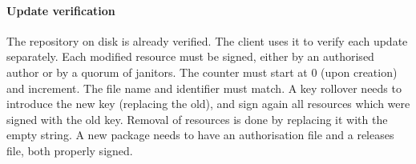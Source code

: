 \documentclass[nocopyrightspace]{sigplanconf}
\begin{document}
\paragraph{Update verification}  The repository on disk is already verified.
The client uses it to verify each update separately.
Each modified resource must be signed, either by an authorised author or by a quorum of janitors.
The counter must start at 0 (upon creation) and increment.
The file name and identifier must match.
A key rollover needs to introduce the new key (replacing the old), and sign again all resources which were signed with the old key.
Removal of resources is done by replacing it with the empty string.
A new package needs to have an authorisation file and a releases file, both properly signed.
\end{document}
